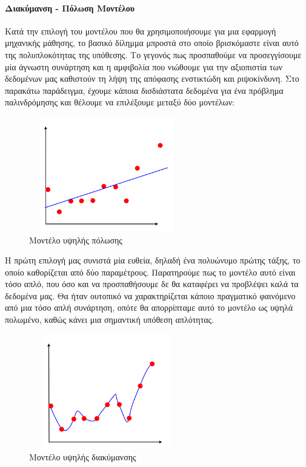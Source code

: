 \documentclass{article}
\begin{document}
\paragraph{Διακύμανση - Πόλωση Μοντέλου}
Κατά την επιλογή του μοντέλου που θα χρησιμοποιήσουμε για μια εφαρμογή μηχανικής μάθησης, το βασικό δίλημμα μπροστά στο οποίο βρισκόμαστε είναι αυτό της πολυπλοκότητας της υπόθεσης. Το γεγονός πως προσπαθούμε να προσεγγίσουμε μία άγνωστη συνάρτηση και η αμφιβολία που νιώθουμε για την αξιοπιστία των δεδομένων μας καθιστούν τη λήψη της απόφασης ενστικτώδη και ριψοκίνδυνη. Στο παρακάτω παράδειγμα, έχουμε κάποια δισδιάστατα δεδομένα για ένα πρόβλημα παλινδρόμησης και θέλουμε να επιλέξουμε μεταξύ δύο μοντέλων:
 \begin{figure}[H]
	\centering			
    \includegraphics[width=0.6\textwidth, height=5cm]{bias.png}
    \caption[Μοντέλο υψηλής πόλωσης]{Μοντέλο υψηλής πόλωσης}
 \end{figure}
 Η πρώτη επιλογή μας συνιστά μία ευθεία, δηλαδή ένα πολυώνυμο πρώτης τάξης, το οποίο καθορίζεται από δύο παραμέτρους. Παρατηρούμε πως το μοντέλο αυτό είναι τόσο απλό, που όσο και να προσπαθήσουμε δε θα καταφέρει να προβλέψει καλά τα δεδομένα μας. Θα ήταν ουτοπικό να χαρακτηρίζεται κάποιο πραγματικό φαινόμενο από μια τόσο απλή συνάρτηση, οπότε θα απορρίπταμε αυτό το μοντέλο ως υψηλά πολωμένο, καθώς κάνει μια σημαντική υπόθεση απλότητας.
 \begin{figure}[H]
	\centering			
    \includegraphics[width=0.6\textwidth, height=5cm]{variance.png}
    \caption[Μοντέλο υψηλής διακύμανσης]{Μοντέλο υψηλής διακύμανσης}
 \end{figure}
\end{document}
